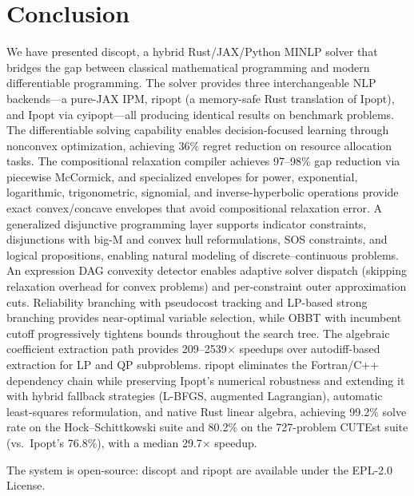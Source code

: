 \documentclass[12pt,preprint]{article}
\begin{document}
\section{Conclusion}
\label{org-conclusion}
We have presented discopt, a hybrid Rust/JAX/Python MINLP solver that bridges the gap between classical mathematical programming and modern differentiable programming. The solver provides three interchangeable NLP backends---a pure-JAX IPM, ripopt (a memory-safe Rust translation of Ipopt), and Ipopt via cyipopt---all producing identical results on benchmark problems. The differentiable solving capability enables decision-focused learning through nonconvex optimization, achieving 36\% regret reduction on resource allocation tasks. The compositional relaxation compiler achieves 97--98\% gap reduction via piecewise McCormick, and specialized envelopes for power, exponential, logarithmic, trigonometric, signomial, and inverse-hyperbolic operations provide exact convex/concave envelopes that avoid compositional relaxation error. A generalized disjunctive programming layer supports indicator constraints, disjunctions with big-M and convex hull reformulations, SOS constraints, and logical propositions, enabling natural modeling of discrete--continuous problems. An expression DAG convexity detector enables adaptive solver dispatch (skipping relaxation overhead for convex problems) and per-constraint outer approximation cuts. Reliability branching with pseudocost tracking and LP-based strong branching provides near-optimal variable selection, while OBBT with incumbent cutoff progressively tightens bounds throughout the search tree. The algebraic coefficient extraction path provides 209--2539$\times$ speedups over autodiff-based extraction for LP and QP subproblems. ripopt eliminates the Fortran/C++ dependency chain while preserving Ipopt's numerical robustness and extending it with hybrid fallback strategies (L-BFGS, augmented Lagrangian), automatic least-squares reformulation, and native Rust linear algebra, achieving 99.2\% solve rate on the Hock--Schittkowski suite and 80.2\% on the 727-problem CUTEst suite (vs.\ Ipopt's 76.8\%), with a median 29.7$\times$ speedup.


The system is open-source: discopt and ripopt are available under the EPL-2.0 License.




\end{document}
